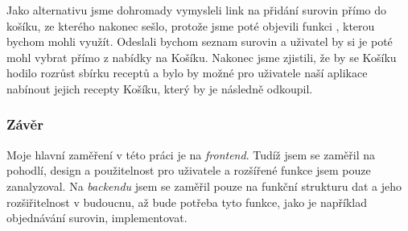 Jako alternativu jsme dohromady vymysleli link na přidání surovin přímo do košíku, ze kterého nakonec sešlo, protože jsme
poté objevili funkci , kterou bychom mohli využít. Odeslali bychom seznam surovin a uživatel by si je poté
mohl vybrat přímo z nabídky na Košíku. Nakonec jsme zjistili, že by se Košíku hodilo rozrůst sbírku receptů a bylo by možné
pro uživatele naší aplikace nabínout jejich recepty Košíku, který by je následně odkoupil. %

\subsubsection{Závěr}
Moje hlavní zaměření v této práci je na \emph{frontend}. Tudíž jsem se zaměřil na pohodlí, design a použitelnost pro uživatele
a rozšířené funkce jsem pouze zanalyzoval. Na \emph{backendu} jsem se zaměřil pouze na funkční strukturu dat a jeho rozšiřitelnost
v budoucnu, až bude potřeba tyto funkce, jako je například objednávání surovin, implementovat.

